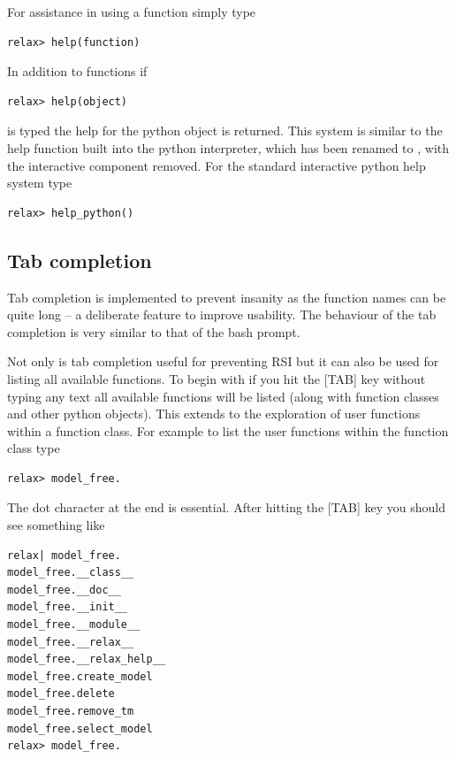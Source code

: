For assistance in using a function simply type

\begin{lstlisting}[numbers=none]
relax> help(function)
\end{lstlisting}

In addition to functions if

\begin{lstlisting}[numbers=none]
relax> help(object)
\end{lstlisting}

is typed the help for the python object is returned.  This system is similar to the help function built into the python interpreter, which has been renamed to , with the interactive component removed.  For the standard interactive python help system type

\begin{lstlisting}[numbers=none]
relax> help_python()
\end{lstlisting}





\subsection{Tab completion}

Tab completion is implemented to prevent insanity as the function names can be quite long -- a deliberate feature to improve usability.  The behaviour of the tab completion is very similar to that of the bash prompt.

Not only is tab completion useful for preventing RSI but it can also be used for listing all available functions.  To begin with if you hit the [TAB] key without typing any text all available functions will be listed (along with function classes and other python objects).  This extends to the exploration of user functions within a function class.  For example to list the user functions within the function class  type

\begin{lstlisting}[numbers=none]
relax> model_free.
\end{lstlisting}

The dot character at the end is essential.  After hitting the [TAB] key you should see something like

\begin{lstlisting}[numbers=none]
relax| model_free.
model_free.__class__
model_free.__doc__
model_free.__init__
model_free.__module__
model_free.__relax__
model_free.__relax_help__
model_free.create_model
model_free.delete
model_free.remove_tm
model_free.select_model
relax> model_free.
\end{lstlisting}

